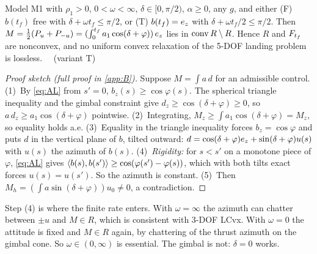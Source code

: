 \begin{theorem}[Theorem B]\label{thm:B}
Model M1 with $\rho_1>0$, $0<\omega<\infty$, $\delta\in[0,\pi/2)$, $\alpha\ge0$, any $g$, and either (F) $b(t_f)$ free with
$\delta+\omega t_f\le\pi/2$, or (T) $b(t_f)=e_z$ with $\delta+\omega t_f/2\le\pi/2$. Then
$M=\tfrac12(P_u+P_{-u})=(\int_0^{t_f}a_1\cos(\delta+\varphi))\,e_z$ lies in $\operatorname{conv} R\setminus R$. Hence $R$ and $F_{t_f}$ are
nonconvex, and no uniform convex relaxation of the 5-DOF landing problem is lossless.
\ \Sproved\ (variant T)
\end{theorem}
\begin{proof}[Proof sketch (full proof in \cref{app:B})]
Suppose $M=\int a\,d$ for an admissible control.
(1)~By \eqref{eq:AL} from $s'=0$, $b_z(s)\ge\cos\varphi(s)$. The spherical triangle inequality and the gimbal constraint
give $d_z\ge\cos(\delta+\varphi)\ge0$, so $a\,d_z\ge a_1\cos(\delta+\varphi)$ pointwise.
(2)~Integrating, $M_z\ge\int a_1\cos(\delta+\varphi)=M_z$, so equality holds a.e.
(3)~Equality in the triangle inequality forces $b_z=\cos\varphi$ and puts $d$ in the vertical plane of $b$, tilted
outward: $d=\cos(\delta+\varphi)e_z+\sin(\delta+\varphi)u(s)$ with $u(s)$ the azimuth of $b(s)$.
(4)~\emph{Rigidity:} for $s<s'$ on a monotone piece of $\varphi$, \eqref{eq:AL} gives
$\langle b(s),b(s')\rangle\ge\cos(\varphi(s')-\varphi(s))$, which with both tilts exact forces $u(s)=u(s')$. So the azimuth is
constant.
(5)~Then $M_h=(\int a\sin(\delta+\varphi))u_0\neq0$, a contradiction.
\end{proof}
Step (4) is where the finite rate enters. With $\omega=\infty$ the azimuth can chatter between $\pm u$ and $M\in R$,
which is consistent with 3-DOF LCvx. With $\omega=0$ the attitude is fixed and $M\in R$ again, by chattering of the
thrust azimuth on the gimbal cone. So $\omega\in(0,\infty)$ is essential. The gimbal is not: $\delta=0$ works.

